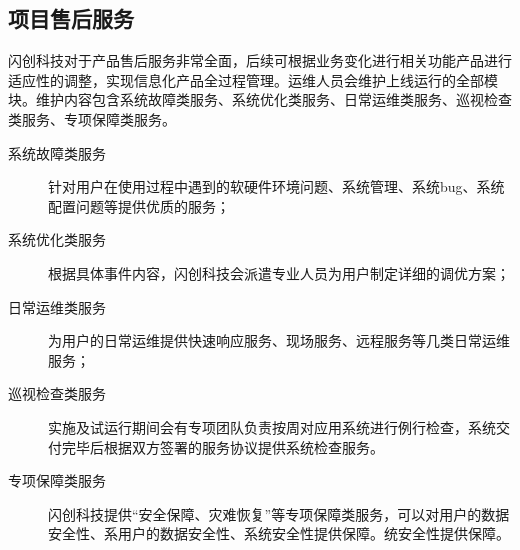 \documentclass[12pt,a4paper,openany]{ctexrep}
\begin{document}
\subsection{项目售后服务}
闪创科技对于产品售后服务非常全面，后续可根据业务变化进行相关功能产品进行适应性的调整，实现信息化产品全过程管理。运维人员会维护上线运行的全部模块。维护内容包含系统故障类服务、系统优化类服务、日常运维类服务、巡视检查类服务、专项保障类服务。
\begin{description}
\item[系统故障类服务]针对用户在使用过程中遇到的软硬件环境问题、系统管理、系统bug、系统配置问题等提供优质的服务；
\item[系统优化类服务]根据具体事件内容，闪创科技会派遣专业人员为用户制定详细的调优方案；
\item[日常运维类服务]为用户的日常运维提供快速响应服务、现场服务、远程服务等几类日常运维服务；
\item[巡视检查类服务]实施及试运行期间会有专项团队负责按周对应用系统进行例行检查，系统交付完毕后根据双方签署的服务协议提供系统检查服务。
\item[专项保障类服务]闪创科技提供“安全保障、灾难恢复”等专项保障类服务，可以对用户的数据安全性、系用户的数据安全性、系统安全性提供保障。统安全性提供保障。
\end{description}
\paragraph{}

\appendix							%
\end{document}
